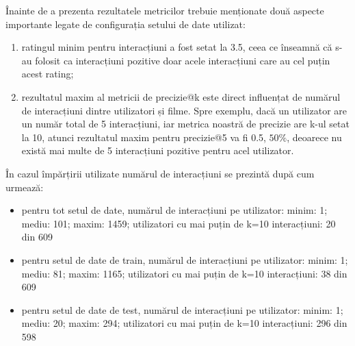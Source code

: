 Înainte de a prezenta rezultatele metricilor trebuie menționate două aspecte importante legate de configurația setului de date utilizat:
\begin{enumerate}
	\item ratingul minim pentru interacțiuni a fost setat la 3.5, ceea ce înseamnă că s-au folosit ca interacțiuni pozitive doar acele interacțiuni care au cel puțin acest rating;
	\item rezultatul maxim al metricii de precizie@k este direct influențat de numărul de interacțiuni dintre utilizatori și filme. Spre exemplu, dacă un utilizator are un număr total de 5 interacțiuni, iar metrica noastră de precizie are k-ul setat la 10, atunci rezultatul maxim pentru precizie@5 va fi 0.5, $50\%$, deoarece nu există mai multe de 5 interacțiuni pozitive pentru acel utilizator.
\end{enumerate}

În cazul împărțirii utilizate numărul de interacțiuni se prezintă după cum urmează:
\begin{itemize}
	\item pentru tot setul de date, numărul de interacțiuni pe utilizator: minim: 1; mediu: 101; maxim: 1459; utilizatori cu mai puțin de k=10 interacțiuni: 20 din 609 
	\item pentru setul de date de train, numărul de interacțiuni pe utilizator: minim: 1; mediu: 81; maxim: 1165; utilizatori cu mai puțin de k=10 interacțiuni: 38 din 609
	\item pentru setul de date de test, numărul de interacțiuni pe utilizator: minim: 1; mediu: 20; maxim: 294; utilizatori cu mai puțin de k=10 interacțiuni: 296 din 598
\end{itemize}

